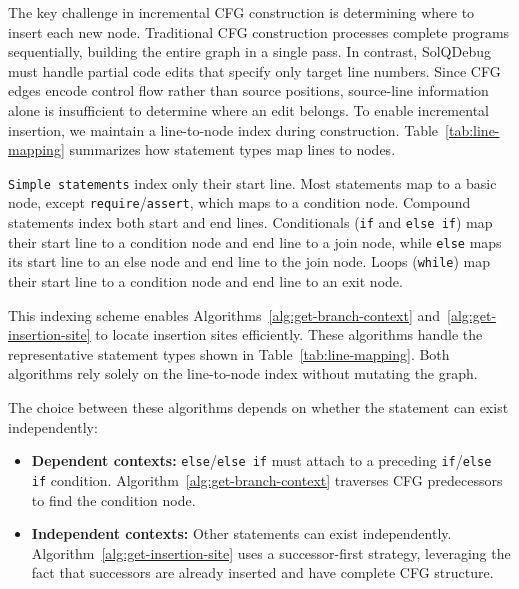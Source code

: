 \documentclass[pdflatex,sn-basic]{sn-jnl}%
\theoremstyle{thmstyleone}%
\theoremstyle{thmstyletwo}%
\theoremstyle{thmstylethree}%
\begin{document}
The key challenge in incremental CFG construction is determining where to insert each new node.
Traditional CFG construction processes complete programs sequentially, building the entire graph in a single pass.
In contrast, SolQDebug must handle partial code edits that specify only target line numbers.
Since CFG edges encode control flow rather than source positions, source-line information alone is insufficient to determine where an edit belongs.
To enable incremental insertion, we maintain a line-to-node index during construction. Table~\ref{tab:line-mapping} summarizes how statement types map lines to nodes.

\texttt{Simple statements} index only their start line.
Most statements map to a basic node, except \texttt{require}/\texttt{assert}, which maps to a condition node.
Compound statements index both start and end lines.
Conditionals (\texttt{if} and \texttt{else if}) map their start line to a condition node and end line to a join node,
while \texttt{else} maps its start line to an else node and end line to the join node.
Loops (\texttt{while}) map their start line to a condition node and end line to an exit node.

This indexing scheme enables Algorithms~\ref{alg:get-branch-context} and~\ref{alg:get-insertion-site} to locate insertion sites efficiently.
These algorithms handle the representative statement types shown in Table~\ref{tab:line-mapping}.
Both algorithms rely solely on the line-to-node index without mutating the graph.

The choice between these algorithms depends on whether the statement can exist independently:
\begin{itemize}
  \item \textbf{Dependent contexts:} \texttt{else}/\texttt{else if} must attach to a preceding \texttt{if}/\texttt{else if} condition. Algorithm~\ref{alg:get-branch-context} traverses CFG predecessors to find the condition node.
  \item \textbf{Independent contexts:} Other statements can exist independently. Algorithm~\ref{alg:get-insertion-site} uses a successor-first strategy, leveraging the fact that successors are already inserted and have complete CFG structure.
\end{itemize}
\end{document}

